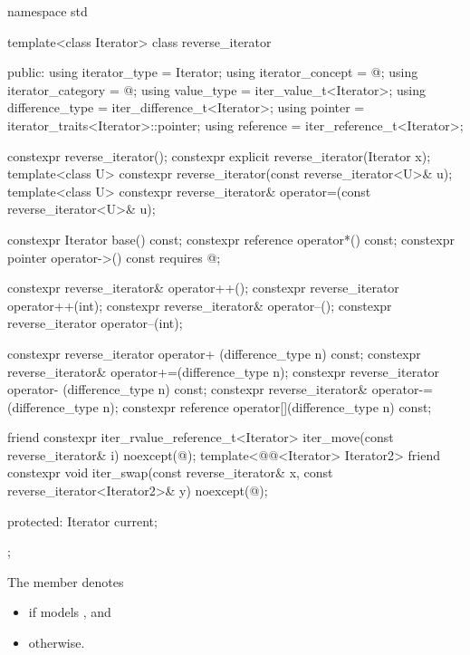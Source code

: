 %
\begin{codeblock}
namespace std {
  template<class Iterator>
  class reverse_iterator {
  public:
    using iterator_type     = Iterator;
    using iterator_concept  = @\seebelow@;
    using iterator_category = @\seebelow@;
    using value_type        = iter_value_t<Iterator>;
    using difference_type   = iter_difference_t<Iterator>;
    using pointer           = iterator_traits<Iterator>::pointer;
    using reference         = iter_reference_t<Iterator>;

    constexpr reverse_iterator();
    constexpr explicit reverse_iterator(Iterator x);
    template<class U> constexpr reverse_iterator(const reverse_iterator<U>& u);
    template<class U> constexpr reverse_iterator& operator=(const reverse_iterator<U>& u);

    constexpr Iterator base() const;
    constexpr reference operator*() const;
    constexpr pointer   operator->() const requires @\seebelow@;

    constexpr reverse_iterator& operator++();
    constexpr reverse_iterator  operator++(int);
    constexpr reverse_iterator& operator--();
    constexpr reverse_iterator  operator--(int);

    constexpr reverse_iterator  operator+ (difference_type n) const;
    constexpr reverse_iterator& operator+=(difference_type n);
    constexpr reverse_iterator  operator- (difference_type n) const;
    constexpr reverse_iterator& operator-=(difference_type n);
    constexpr reference operator[](difference_type n) const;

    friend constexpr iter_rvalue_reference_t<Iterator>
      iter_move(const reverse_iterator& i) noexcept(@\seebelow@);
    template<@@<Iterator> Iterator2>
      friend constexpr void
        iter_swap(const reverse_iterator& x,
                  const reverse_iterator<Iterator2>& y) noexcept(@\seebelow@);

  protected:
    Iterator current;
  };
}
\end{codeblock}

\pnum
The member   denotes
\begin{itemize}
\item
{} if  models
, and
\item
{} otherwise.
\end{itemize}

